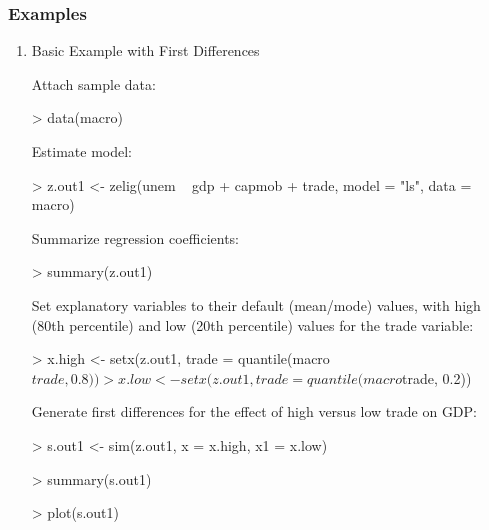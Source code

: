 \subsubsection{Examples}
\begin{enumerate}
\item Basic Example with First Differences

Attach sample data:
\begin{Schunk}
\begin{Sinput}
> data(macro)
\end{Sinput}
\end{Schunk}
Estimate model:
\begin{Schunk}
\begin{Sinput}
> z.out1 <- zelig(unem ~ gdp + capmob + trade, model = "ls", data = macro)
\end{Sinput}
\end{Schunk}
Summarize regression coefficients:
\begin{Schunk}
\begin{Sinput}
> summary(z.out1)
\end{Sinput}
\end{Schunk}
Set explanatory variables to their default (mean/mode) values, with
high (80th percentile) and low (20th percentile) values for the trade variable:
\begin{Schunk}
\begin{Sinput}
> x.high <- setx(z.out1, trade = quantile(macro$trade, 0.8))
> x.low <- setx(z.out1, trade = quantile(macro$trade, 0.2))
\end{Sinput}
\end{Schunk}
Generate first differences for the effect of high versus low trade on
GDP:
\begin{Schunk}
\begin{Sinput}
> s.out1 <- sim(z.out1, x = x.high, x1 = x.low)
\end{Sinput}
\end{Schunk}
\begin{Schunk}
\begin{Sinput}
> summary(s.out1)
\end{Sinput}
\end{Schunk}
\begin{center}
\begin{Schunk}
\begin{Sinput}
> plot(s.out1)
\end{Sinput}
\end{Schunk}

\end{center}
\end{enumerate}
